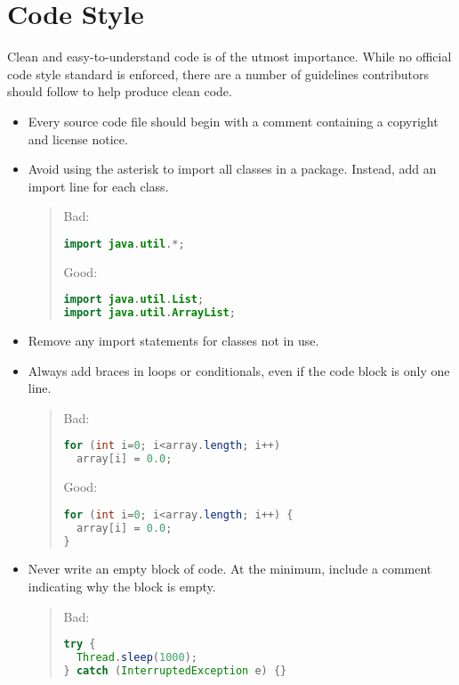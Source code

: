 \section{Code Style}

Clean and easy-to-understand code is of the utmost importance.  While no official code style standard is enforced, there are a number of guidelines contributors should follow to help produce clean code.

\begin{itemize}
  \item Every source code file should begin with a comment containing a copyright and license notice.
  
  \item Avoid using the asterisk to import all classes in a package.  Instead, add an import line for each class.
    \begin{quote}
      Bad:
      \begin{lstlisting}[language=Java]
import java.util.*;
      \end{lstlisting}
      
      Good:
      \begin{lstlisting}[language=Java]
import java.util.List;
import java.util.ArrayList;
      \end{lstlisting}
    \end{quote}
  
  \item Remove any import statements for classes not in use.
  
  \item Always add braces in loops or conditionals, even if the code block is only one line.
    \begin{quote}
      Bad:
      \begin{lstlisting}[language=Java]
for (int i=0; i<array.length; i++)
  array[i] = 0.0;
      \end{lstlisting}
      
      Good:
      \begin{lstlisting}[language=Java]
for (int i=0; i<array.length; i++) {
  array[i] = 0.0;
}
      \end{lstlisting}
    \end{quote}
  
  \item Never write an empty block of code.  At the minimum, include a comment indicating why the block is empty.
    \begin{quote}
      Bad:
      \begin{lstlisting}[language=Java]
try {
  Thread.sleep(1000);
} catch (InterruptedException e) {}
      \end{lstlisting}
      

\end{quote}
\end{itemize}
